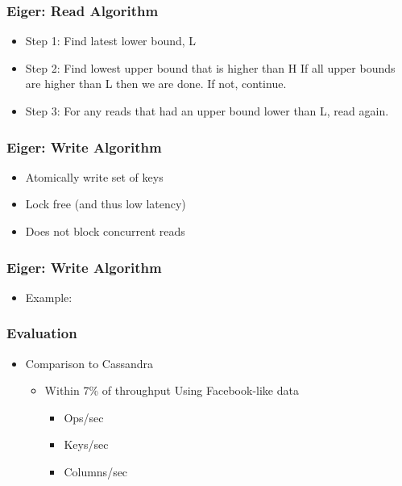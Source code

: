 \documentclass{beamer}
\begin{document}
\begin{frame}
\frametitle{Eiger: Read Algorithm}
\begin{itemize}
\item Step 1: Find latest lower bound, L
\item Step 2: Find lowest upper bound that is higher than H
\newline If all upper bounds are higher than L then we are done.  If not, continue. 
\item Step 3: For any reads that had an upper bound lower than L, read again.
\end{itemize}  
\end{frame}


\begin{frame}
\frametitle{Eiger: Write Algorithm}
\begin{itemize}
\item Atomically write set of keys
\pause \item Lock free (and thus low latency)
\pause \item Does not block concurrent reads
\end{itemize}  
\end{frame}

\begin{frame}
\frametitle{Eiger: Write Algorithm}
\begin{itemize}
	\item Example:
\end{itemize}  
\end{frame}




\begin{frame}
\frametitle{Evaluation}
\begin{itemize}
\pause \item Comparison to Cassandra
		\begin{itemize}
			\item Within 7\% of throughput Using Facebook-like data
			\begin{itemize}
				\item Ops/sec
				\item Keys/sec
				\item Columns/sec
			\end{itemize}
		\end{itemize}
\end{itemize}  
\end{frame}
\end{document}
